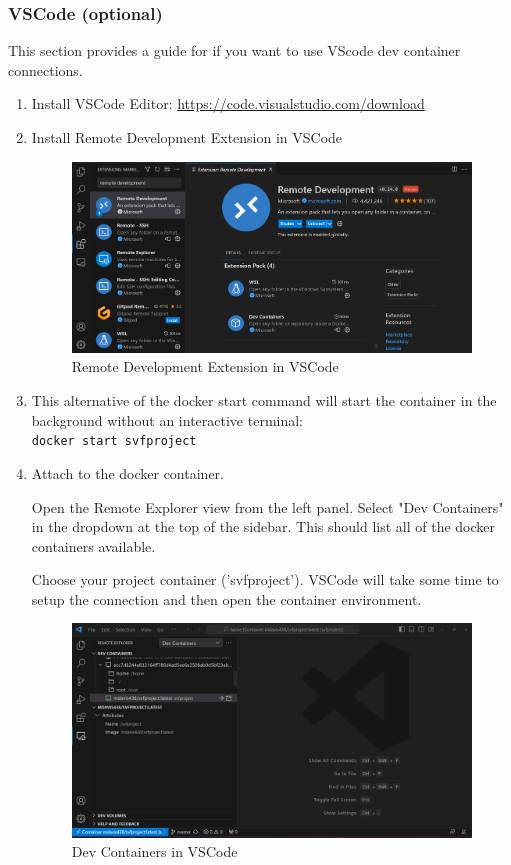 \documentclass[12pt]{article}
\newcommand{\codeIn}[1]{{\small\tt{#1}}}
\begin{document}
\subsubsection{VSCode (optional)}

This section provides a guide for if you want to use VScode dev container connections.

\begin{enumerate}
    \item Install VSCode Editor: \url{https://code.visualstudio.com/download}
    
    \item Install Remote Development Extension in VSCode
    \begin{figure}[htpb]
        \centering
        \includegraphics[width=0.8\linewidth]{extension.png}
        \caption{Remote Development Extension in VSCode}
        \label{fig:install_docker}
    \end{figure}

    \item This alternative of the docker start command will start the container in the background without an interactive terminal:\\
    \codeIn{docker start svfproject}

    \item Attach to the docker container. 
    
    Open the Remote Explorer view from the left panel. Select "Dev Containers" in the dropdown at the top of the sidebar. This should list all of the docker containers available.
    
    Choose your project container ('svfproject'). VSCode will take some time to setup the connection and then open the container environment.
    
    \begin{figure}[htpb]
        \centering
        \includegraphics[width=0.8\linewidth]{attach.png}
        \caption{Dev Containers in VSCode}
        \label{fig:install_docker}
    \end{figure}


\end{enumerate}
\end{document}
